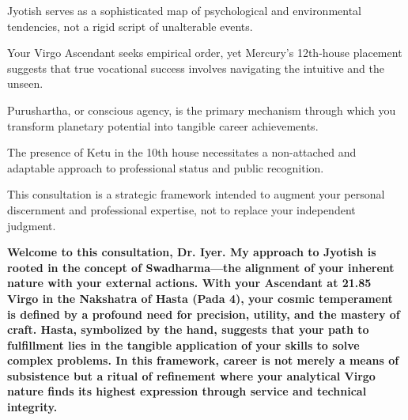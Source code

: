 \begin{diamondlist}
  \item {\fontsize{8.5}{12}\selectfont Jyotish serves as a sophisticated map of psychological and environmental tendencies, not a rigid script of unalterable events.}
  \item {\fontsize{8.5}{12}\selectfont Your Virgo Ascendant seeks empirical order, yet Mercury's 12th-house placement suggests that true vocational success involves navigating the intuitive and the unseen.}
  \item {\fontsize{8.5}{12}\selectfont Purushartha, or conscious agency, is the primary mechanism through which you transform planetary potential into tangible career achievements.}
  \item {\fontsize{8.5}{12}\selectfont The presence of Ketu in the 10th house necessitates a non-attached and adaptable approach to professional status and public recognition.}
  \item {\fontsize{8.5}{12}\selectfont This consultation is a strategic framework intended to augment your personal discernment and professional expertise, not to replace your independent judgment.}
\end{diamondlist}


\label{topic3}

{\fontsize{9.5}{13.8}\selectfont\bfseries\color{DeepSlate} Welcome to this consultation, Dr. Iyer. My approach to Jyotish is rooted in the concept of Swadharma---the alignment of your inherent nature with your external actions. With your Ascendant at 21.85\textdegree{} Virgo in the Nakshatra of Hasta (Pada 4), your cosmic temperament is defined by a profound need for precision, utility, and the mastery of craft. Hasta, symbolized by the hand, suggests that your path to fulfillment lies in the tangible application of your skills to solve complex problems. In this framework, career is not merely a means of subsistence but a ritual of refinement where your analytical Virgo nature finds its highest expression through service and technical integrity.}\par\vspace{2mm}

